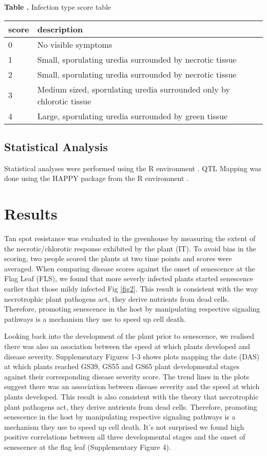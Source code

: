 \documentclass{frontiersSCNS} %
\begin{document}
\begin{table}[!t]
\textbf{\label{Tab:02} Table .}{ Infection type score table}\\
\processtable{}
{\begin{tabular}{l|l}
\hline
	score & description \\\midrule
	0 & No visible symptoms \\
	1  & Small, sporulating uredia surrounded by necrotic tissue \\
	2 & Small, sporulating uredia surrounded by necrotic tissue \\
	3 & Medium sized, sporulating uredia surrounded only by chlorotic tissue \\
	4 & Large, sporulating uredia surrounded by green tissue \\ \hline
\end{tabular}}{}
\end{table}


\subsection{Statistical Analysis}
Statistical analyses were performed using the R environment \cite{RManual}. QTL Mapping was done using the HAPPY package from the R environment \cite{Mott07112000}.

\section{Results}
Tan spot resistance was evaluated in the greenhouse by measuring the extent of the necrotic/chlorotic response exhibited by the plant (IT). To avoid bias in the scoring, two people scored the plants at two time points and scores were averaged. When comparing disease scores against the onset of senescence at the Flag Leaf (FLS), we found that more severly infected plants started senescence earlier that those mildy infected Fig \ref{fig2}. This result is consistent with the way necrotrophic plant pathogens act, they derive nutrients from dead cells. Therefore, promoting senescence in the host by manipulating respective signaling pathways is a mechanism they use to speed up cell death.  

Looking back into the development of the plant prior to senescence, we realised there was also an asociation between the speed at which plants developed and disease severity. Supplementary Figures 1-3 shows plots mapping the date (DAS) at which plants reached GS39, GS55 and GS65 plant developmental stages against their corresponding disease severity score. The trend lines in the plots suggest there was an association between disease severity and the speed at which plants developed. This result is also consistent with the theory that necrotrophic plant pathogens act, they derive nutrients from dead cells. Therefore, promoting senescence in the host by manipulating respective signaling pathways is a mechanism they use to speed up cell death. It's not surprised we found high positive correlations between all three developmental stages and the onset of senescence at the flag leaf (Supplementary Figure 4).
\end{document}
